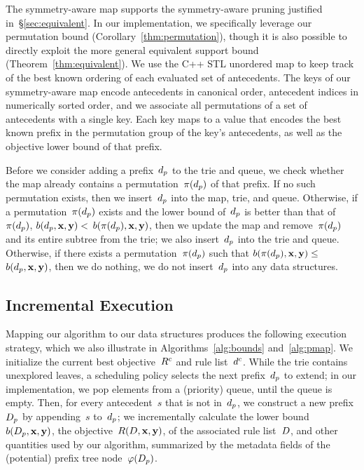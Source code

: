 The symmetry-aware map supports the symmetry-aware pruning justified in~\S\ref{sec:equivalent}.
%
In our implementation, we specifically leverage our permutation bound
(Corollary~\ref{thm:permutation}), though it is also possible to directly
exploit the more general equivalent support bound (Theorem~\ref{thm:equivalent}).
%
We use the C++ STL unordered map to keep track of the best known ordering
of each evaluated set of antecedents.
%
The keys of our symmetry-aware map encode antecedents in canonical order,
\ie antecedent indices in numerically sorted order,
and we associate all permutations of a set of antecedents with a single key.
%
Each key maps to a value that encodes the best known prefix in the permutation
group of the key's antecedents, as well as the objective lower bound of that prefix.

Before we consider adding a prefix~$d_p$ to the trie and queue, we check
whether the map already contains a permutation~$\pi(d_p)$ of that prefix.
%
If no such permutation exists, then we insert~$d_p$ into the map, trie, and queue.
%
Otherwise, if a permutation~$\pi(d_p)$ exists and the lower bound of~$d_p$ is better
than that of~$\pi(d_p)$, \ie ${b(d_p, \mathbf{x}, \mathbf{y}) <}$ ${b(\pi(d_p), \mathbf{x}, \mathbf{y})}$,
then we update the map and remove~$\pi(d_p)$ and its entire subtree from the trie;
we also insert~$d_p$ into the trie and queue.
%
Otherwise, if there exists a permutation~$\pi(d_p)$ such that
${b(\pi(d_p), \mathbf{x}, \mathbf{y}) \le}$ ${b(d_p, \mathbf{x}, \mathbf{y})}$,
then we do nothing, \ie we do not insert~$d_p$ into any data structures.

\subsection{Incremental Execution}
\label{sec:execution}

Mapping our algorithm to our data structures produces the following execution strategy,
which we also illustrate in Algorithms~\ref{alg:bounds} and~\ref{alg:pmap}.
%
We initialize the current best objective~${R^c}$ and rule list~$d^c$.
%
While the trie contains unexplored leaves, a scheduling policy selects the next prefix~$d_p$
to extend; in our implementation, we pop elements from a (priority) queue, until the queue is empty.
%
Then, for every antecedent~$s$ that is not in~$d_p$,
we construct a new prefix~$D_p$ by appending~$s$ to~$d_p$;
we incrementally calculate the lower bound~$b(D_p, \mathbf{x}, \mathbf{y})$,
the objective~$R({D}, \mathbf{x}, \mathbf{y})$, of the associated rule list~${D}$,
and other quantities used by our algorithm, summarized by the metadata fields of
the (potential) prefix tree node~$\varphi(D_p)$.

